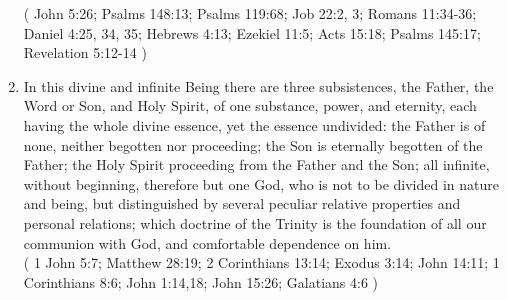 \documentclass[12pt,a4paper]{book}
\begin{document}
\begin{enumerate}
( John 5:26; Psalms 148:13; Psalms 119:68; Job 22:2, 3; Romans 11:34-36; Daniel 4:25, 34, 35; Hebrews 4:13; Ezekiel 11:5; Acts 15:18; Psalms 145:17; Revelation 5:12-14 )
\item
\label{ch-God-3}
In this divine and infinite Being there are three subsistences, the Father, the Word or Son, and Holy Spirit, of one substance, power, and eternity, each having the whole divine essence, yet the essence undivided: the Father is of none, neither begotten nor proceeding; the Son is eternally begotten of the Father; the Holy Spirit proceeding from the Father and the Son; all infinite, without beginning, therefore but one God, who is not to be divided in nature and being, but distinguished by several peculiar relative properties and personal relations; which doctrine of the Trinity is the foundation of all our communion with God, and comfortable dependence on him.\\
( 1 John 5:7; Matthew 28:19; 2 Corinthians 13:14; Exodus 3:14; John 14:11; 1 Corinthians 8:6; John 1:14,18; John 15:26; Galatians 4:6 )
\end{enumerate}
\end{document}
